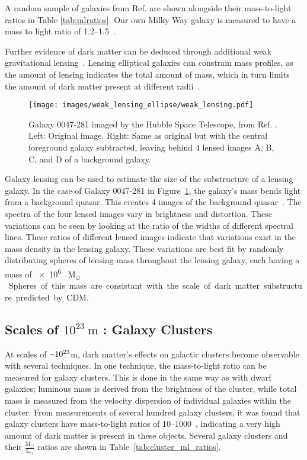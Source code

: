 A random sample of galaxies from Ref. \cite{faber_ml} are shown alongside their mass-to-light ratios in Table \ref{tab:mlratios}.
Our own Milky Way galaxy is measured to have a mass to light ratio of \SIrange{1.2}{1.5}{}~\cite{milkyway_ml_ratio}.

Further evidence of dark matter can be deduced through additional weak gravitational lensing~\cite{weak_lensing_2001}.
Lensing elliptical galaxies can constrain mass profiles, as the amount of lensing indicates the total amount of mass, which in turn limits the amount of dark matter present at different radii~\cite{weak_lensing_ellipse}.

\begin{figure}[!b]
  \centering
  \texttt{[image: images/weak\_lensing\_ellipse/weak\_lensing.pdf]}
  \caption[Weak Lensing with an Ellipse Galaxy]{
    Galaxy 0047-281 imaged by the Hubble Space Telescope, from Ref. \cite{weak_lensing_ellipse}.
    Left: Original image.
    Right: Same as original but with the central foreground galaxy subtracted, leaving behind 4 lensed images A, B, C, and D of a background galaxy.
  }
  \label{fig:ellipse}
\end{figure}
    
Galaxy lensing can be used to estimate the size of the substructure of a lensing galaxy.
In the case of Galaxy 0047-281 in Figure~\ref{fig:ellipse}, the galaxy's mass bends light from a background quasar.
This creates 4 images of the background quasar~\cite{weak_lensing_quasar}.
The spectra of the four lensed images vary in brightness and distortion.
These variations can be seen by looking at the ratio of the widths of different spectral lines.
These ratios of different lensed images indicate that variations exist in the mass density in the lensing galaxy.
These variations are best fit by randomly distributing spheres of lensing mass throughout the lensing galaxy, each having a mass of \SI{e6}{ M${{}_\odot}$ }.
Spheres of this mass are consistant with the scale of dark matter substructure predicted by CDM.

\subsection{Scales of $10^{23}\:\text{m}$ : Galaxy Clusters}\label{dm_galclusters}
%
At scales of $\nicetilde 10^{23}$m, dark matter's effects on galactic clusters become observable with several techniques.
In one technique, the mass-to-light ratio can be measured for galaxy clusters.
This is done in the same way as with dwarf galaxies; luminous mass is derived from the brightness of the cluster, while total mass is measured from the velocity dispersion of individual galaxies within the cluster.
From measurements of several hundred galaxy clusters, it was found that galaxy clusters have mass-to-light ratios of \SIrange{10}{1000}{}~\cite{cluster_ml_ratios}, indicating a very high amount of dark matter is present in these objects.
Several galaxy clusters and their $\frac{\textrm{M}_\odot}{\textrm{L}_\odot}$ ratios are shown in Table~\ref{tab:cluster_ml_ratios}.

